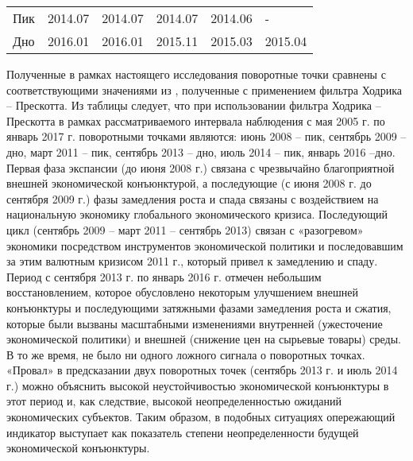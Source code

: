 \documentclass[a4paper,14pt]{extreport}
\begin{document}
\begin{table}[]
\begin{tabular}{|l|l|l|l|l|l|}
				Пик                                                                                                   & 2014.07                                                                                                                                                    & 2014.07                                                                    & 2014.07                                                                          & 2014.06                                                                   & -                                                                                \\
				Дно                                                                                                   & 2016.01                                                                                                                                                    & 2016.01                                                                    & 2015.11                                                                          & 2015.03                                                                   & 2015.04                                                                          \\ \hline
			\end{tabular}
		\label{tbl:tpoints_re}	
	\end{table}
	
	Полученные в рамках настоящего исследования поворотные точки сравнены с соответствующими значениями из \cite{esiMakingAlt}, полученные с применением фильтра Ходрика -- Прескотта. Из таблицы следует, что при использовании фильтра Ходрика -- Прескотта  в   рамках рассматриваемого интервала наблюдения с мая 2005 г. по январь 2017 г. поворотными точками являются: июнь 2008 -- пик, сентябрь 2009 -- дно, март 2011 -- пик, сентябрь 2013 -- дно, июль 2014 -- пик, январь 2016 --дно. Первая фаза экспансии (до июня 2008 г.) связана с чрезвычайно благоприятной внешней экономической конъюнктурой, а последующие (с июня 2008 г. до сентября 2009 г.) фазы замедления роста и спада связаны с воздействием на национальную экономику глобального экономического кризиса. Последующий цикл (сентябрь 2009 -- март 2011 -- сентябрь 2013) связан с «разогревом» экономики посредством инструментов экономической политики и последовавшим за этим валютным кризисом 2011 г., который привел к замедлению и спаду. Период с сентября 2013 г. по январь 2016 г. отмечен небольшим восстановлением, которое обусловлено некоторым улучшением внешней конъюнктуры и последующими затяжными фазами замедления роста и сжатия, которые были вызваны масштабными изменениями внутренней (ужесточение экономической политики) и внешней (снижение цен на сырьевые товары) среды. В то же время, не было ни одного ложного сигнала о поворотных точках. «Провал» в предсказании двух поворотных точек (сентябрь 2013 г. и июль 2014 г.) можно объяснить высокой неустойчивостью экономической конъюнктуры в этот период и, как следствие, высокой неопределенностью ожиданий экономических субъектов. Таким образом, в подобных ситуациях опережающий индикатор выступает как показатель степени неопределенности будущей экономической конъюнктуры.
	
\end{document}
